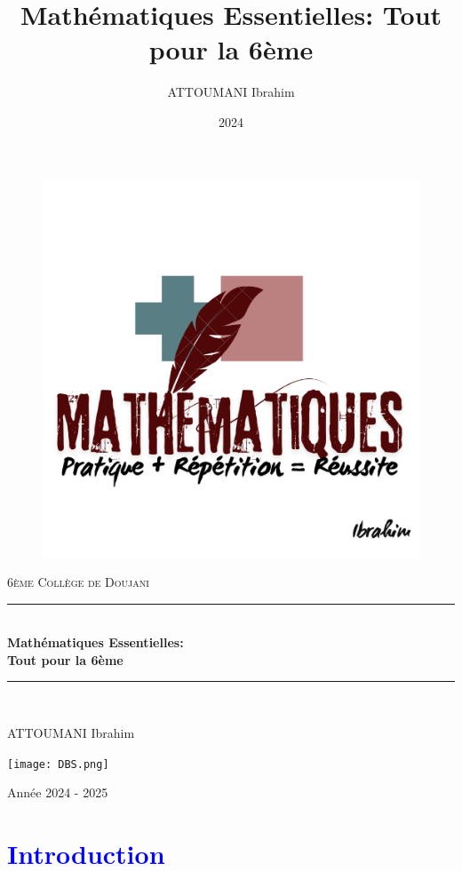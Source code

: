 \documentclass{article}
\title{Mathématiques Essentielles: Tout pour la 6ème }
\author{ATTOUMANI Ibrahim }
\date{2024}
\begin{document}
\begin{titlepage}

\newcommand{\HRule}{\rule{\linewidth}{0.5mm}}
\center 


\begin{figure}
    \centering
    \includegraphics[width=0.5\linewidth]{LogoMath.png}
\end{figure}


\textsc{\Large 6ème Collège de Doujani }\\[1cm] %
\HRule \\[0.4cm]
{ \huge \bfseries Mathématiques Essentielles: \\ Tout pour la 6ème }\\[0.4cm]
\HRule \\[1.5cm]
\begin{center}
\begin{Large}
ATTOUMANI Ibrahim 
\end{Large}
\end{center}
    

\begin{center}
\vfill{\texttt{[image: DBS.png]}}\vspace{0.5cm}\\
\begin{Large} Année 2024 - 2025
\end{Large}



\end{center}

\end{titlepage}

\pagebreak

\tableofcontents
\pagebreak

\newpage
\section{\textcolor{blue}{Introduction}}
\end{document}
